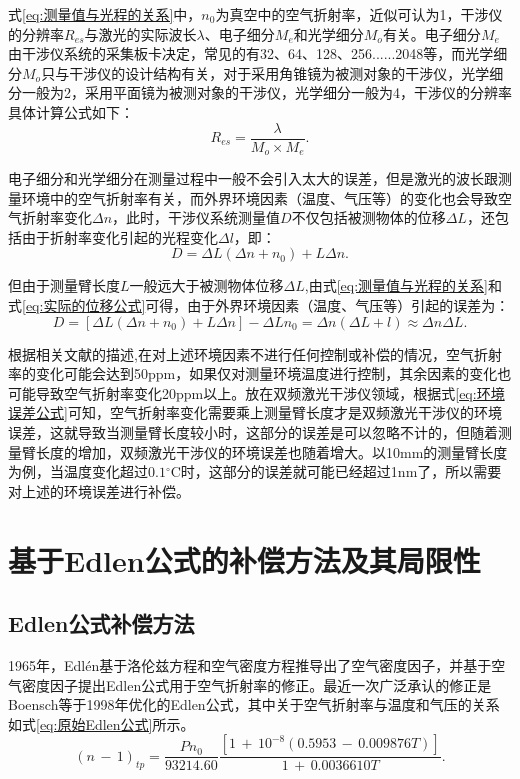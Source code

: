 式\eqref{eq:测量值与光程的关系}中，\(n_0\)为真空中的空气折射率，近似可认为1，干涉仪的分辨率\(R_{es}\)与激光的实际波长\(\lambda\)、电子细分\(M_e\)和光学细分\(M_o\)有关。电子细分\(M_e\)由干涉仪系统的采集板卡决定，常见的有32、64、128、256......2048等，而光学细分\(M_o\)只与干涉仪的设计结构有关，对于采用角锥镜为被测对象的干涉仪，光学细分一般为2，采用平面镜为被测对象的干涉仪，光学细分一般为4，干涉仪的分辨率具体计算公式如下：
\begin{equation}\label{eq:分辨率与细分的关系}
    R_{es}=\frac{\lambda}{M_o{\times}M_e}.
\end{equation}

电子细分和光学细分在测量过程中一般不会引入太大的误差，但是激光的波长跟测量环境中的空气折射率有关，而外界环境因素（温度、气压等）的变化也会导致空气折射率变化\(\Delta n\)，此时，干涉仪系统测量值\(D\)不仅包括被测物体的位移\(\Delta L\)，还包括由于折射率变化引起的光程变化\(\Delta l\)，即：
\begin{equation}\label{eq:实际的位移公式}
    D=\Delta L(\Delta n+n_0)+L\Delta n.
\end{equation}

但由于测量臂长度\(L\)一般远大于被测物体位移\(\Delta L\),由式\eqref{eq:测量值与光程的关系}和式\eqref{eq:实际的位移公式}可得，由于外界环境因素（温度、气压等）引起的误差为：
\begin{equation}\label{eq:环境误差公式}
    D=[\Delta L(\Delta n+n_0)+L\Delta n]-\Delta Ln_0=\Delta n(\Delta L+l) \approx \Delta n \Delta L.
\end{equation}

根据相关文献的描述\cite{徐建2013双频激光干涉仪系统线性测量误差主要来源及减小误差的方法分析},在对上述环境因素不进行任何控制或补偿的情况，空气折射率的变化可能会达到50ppm，如果仅对测量环境温度进行控制，其余因素的变化也可能导致空气折射率变化20ppm以上。放在双频激光干涉仪领域，根据式\eqref{eq:环境误差公式}可知，空气折射率变化需要乘上测量臂长度才是双频激光干涉仪的环境误差，这就导致当测量臂长度较小时，这部分的误差是可以忽略不计的，但随着测量臂长度的增加，双频激光干涉仪的环境误差也随着增大。以10mm的测量臂长度为例，当温度变化超过\(0.1\)$^{\circ}$C时，这部分的误差就可能已经超过1nm了，所以需要对上述的环境误差进行补偿。

\section{基于Edlen公式的补偿方法及其局限性}
\subsection{Edlen公式补偿方法}
1965年，Edlén基于洛伦兹方程和空气密度方程推导出了空气密度因子，并基于空气密度因子提出Edlen公式用于空气折射率的修正\cite{2015Refractive}。最近一次广泛承认的修正是Boensch等\cite{1998Fit}于1998年优化的Edlen公式，其中关于空气折射率与温度和气压的关系如式\eqref{eq:原始Edlen公式}所示。
    \begin{equation}\label{eq:原始Edlen公式}
    (n\,-\,1)_{tp}=\frac{Pn_0}{93214.60}\frac{[1\,+\,10^{-8}(0.5953\,-\,0.009876T)]}{1\,+\,0.0036610T}.
    \end{equation}

